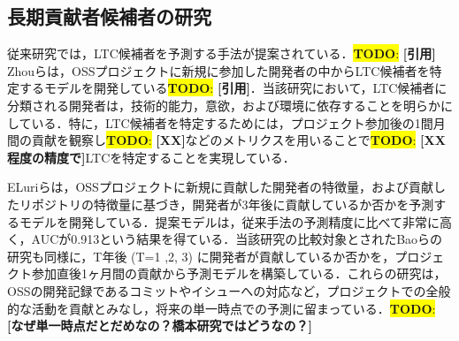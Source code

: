 \documentclass[submit,techrep,noauthor]{ipsj}
\newcommand{\todo}[1]{\colorbox{yellow}{{\bf TODO}:}{\color{red} {\textbf{[#1]}}}}
\begin{document}
\subsection{長期貢献者候補者の研究}

従来研究では，LTC候補者を予測する手法が提案されている．\todo{引用}
Zhouらは，OSSプロジェクトに新規に参加した開発者の中からLTC候補者を特定するモデルを開発している\cite{related1}\todo{引用}．当該研究において，LTC候補者に分類される開発者は，技術的能力，意欲，および環境に依存することを明らかにしている．特に，LTC候補者を特定するためには，プロジェクト参加後の1間月間の貢献を観察し\todo{XX}などのメトリクスを用いることで\todo{XX程度の精度で}LTCを特定することを実現している．



ELuriらは，OSSプロジェクトに新規に貢献した開発者の特徴量，および貢献したリポジトリの特徴量に基づき，開発者が3年後に貢献しているか否かを予測するモデルを開発している\cite{related1}．提案モデルは，従来手法の予測精度に比べて非常に高く，AUCが0.913という結果を得ている．当該研究の比較対象とされたBaoらの研究も同様に，T年後 (T=1 ,2, 3) に開発者が貢献しているか否かを，プロジェクト参加直後1ヶ月間の貢献から予測モデルを構築している．これらの研究は，OSSの開発記録であるコミットやイシューへの対応など，プロジェクトでの全般的な活動を貢献とみなし，将来の単一時点での予測に留まっている．\todo{なぜ単一時点だとだめなの？橋本研究ではどうなの？}


\end{document}
